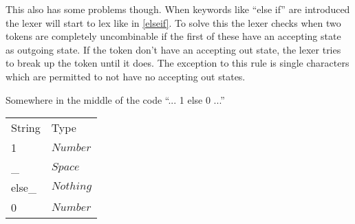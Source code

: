 This also has some problems though. When keywords like ``else if'' are
introduced the lexer will start to lex like in \cref{elseif}. To solve this the
lexer checks when two tokens are completely uncombinable if the first of these
have an accepting state as outgoing state. If the token don't have an accepting
out state, the lexer tries to break up the token until it does. The exception to
this rule is single characters which are permitted to not have no accepting out
states.
\begin{example}\label{elseif}
Somewhere in the middle of the code ``... 1 else 0 ...''
\begin{center}
\begin{tabular}{ll}
String & Type\\
1 & $Number$\\
\_ & $Space$\\
else\_ & $Nothing$\\
0 & $Number$\\
\end{tabular}
\end{center}
\end{example}

